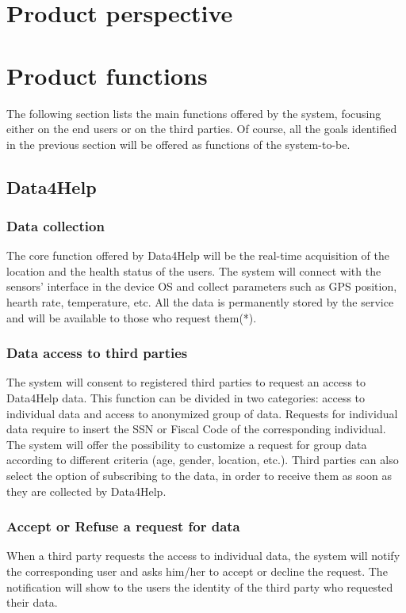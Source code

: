 \section{Product perspective}
\section{Product functions}
    The following section lists the main functions offered by the system, focusing either on the end users or on the third parties.
    Of course, all the goals identified in the previous section will be offered as functions of the system-to-be.
    
    \subsection{Data4Help}
        \subsubsection {Data collection}
            The core function offered by Data4Help will be the real-time acquisition of the location and the health status of the users. The system will connect with the sensors' interface in the device OS and collect parameters such as GPS position, hearth rate, temperature, etc.
            All the data is permanently stored by the service and will be available to those who request them(*).
        
        \subsubsection {Data access to third parties}
            The system will consent to registered third parties to request an access to Data4Help data. This function can be divided in two categories: access to individual data and access to anonymized group of data. 
            Requests for individual data require to insert the SSN or Fiscal Code of the corresponding individual.
            The system will offer the possibility to customize a request for group data according to different criteria (age, gender, location, etc.).
            Third parties can also select the option of subscribing to the data, in order to receive them as soon as they are collected by Data4Help.
        
        \subsubsection {Accept or Refuse a request for data}
            When a third party requests the access to individual data, the system will notify the corresponding user and asks him/her to accept or decline the request. 
            The notification will show to the users the identity of the third party who requested their data.
        
